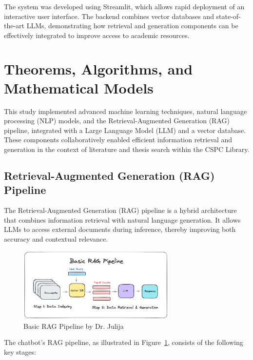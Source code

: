 \begin{refsection}
The system was developed using Streamlit, which allows rapid deployment of an interactive user interface. The backend combines vector databases and state-of-the-art LLMs, demonstrating how retrieval and generation components can be effectively integrated to improve access to academic resources.

\section{Theorems, Algorithms, and Mathematical Models}

This study implemented advanced machine learning techniques, natural language processing (NLP) models, and the Retrieval-Augmented Generation (RAG) pipeline, integrated with a Large Language Model (LLM) and a vector database. These components collaboratively enabled efficient information retrieval and generation in the context of literature and thesis search within the CSPC Library.


\subsection{Retrieval-Augmented Generation (RAG) Pipeline}

The Retrieval-Augmented Generation (RAG) pipeline is a hybrid architecture that combines information retrieval with natural language generation. It allows LLMs to access external documents during inference, thereby improving both accuracy and contextual relevance.

\begin{figure}[htbp]
    \centering
    \includegraphics[width=0.7\textwidth]{figures/rag.png}
    \caption{Basic RAG Pipeline by Dr. Julija}
    \label{fig:rag}
\end{figure}

The chatbot’s RAG pipeline, as illustrated in Figure~\ref{fig:rag}, consists of the following key stages:


\end{refsection}
